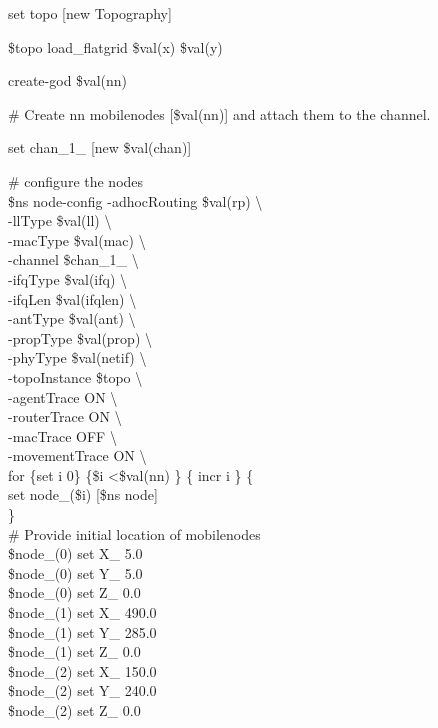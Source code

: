 \documentclass[times,10pt,onecolumn]{article}
\begin{document}
set topo       [new Topography]

\$topo load\_flatgrid \$val(x) \$val(y)

create-god \$val(nn)

\#  Create nn mobilenodes [\$val(nn)] and attach them to the channel. 

set chan\_1\_ [new \$val(chan)]


\# configure the nodes\\
        \$ns node-config -adhocRouting \$val(rp) \textbackslash \\
			 -llType \$val(ll) \textbackslash \\
			 -macType \$val(mac) \textbackslash \\
			 -channel \$chan\_1\_ \textbackslash \\
			 -ifqType \$val(ifq) \textbackslash \\
			 -ifqLen \$val(ifqlen) \textbackslash \\
			 -antType \$val(ant) \textbackslash \\
			 -propType \$val(prop) \textbackslash \\ 
			 -phyType \$val(netif) \textbackslash \\
			 -topoInstance \$topo \textbackslash \\
			 -agentTrace ON \textbackslash \\
			 -routerTrace ON \textbackslash \\
			 -macTrace OFF \textbackslash \\
			 -movementTrace ON \textbackslash \\
			 
			 
	for \{set i 0\} \{\$i \textless  \$val(nn) \} \{ incr i \} \{ \\
		set node\_(\$i) [\$ns node]	\\
	\} \\


\# Provide initial location of mobilenodes\\
\$node\_(0) set X\_ 5.0 \\
\$node\_(0) set Y\_ 5.0 \\
\$node\_(0) set Z\_ 0.0 \\
\$node\_(1) set X\_ 490.0 \\
\$node\_(1) set Y\_ 285.0 \\
\$node\_(1) set Z\_ 0.0 \\
\$node\_(2) set X\_ 150.0 \\
\$node\_(2) set Y\_ 240.0 \\
\$node\_(2) set Z\_ 0.0 \\
\end{document}
